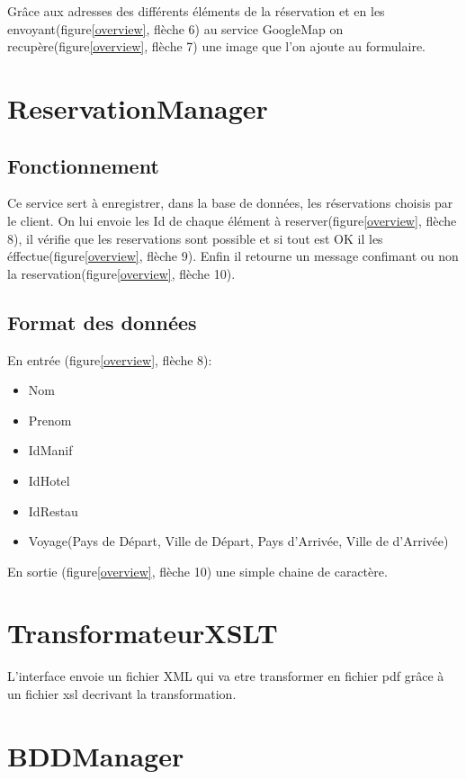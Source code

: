 		Grâce aux adresses des différents éléments de la réservation et en les
		envoyant(figure\ref{overview}, flèche 6) au service GoogleMap on
		recupère(figure\ref{overview}, flèche 7) une image que l'on ajoute au
		formulaire.
	
	\section{ReservationManager}	
	
		\subsection{Fonctionnement}
	
			Ce service sert à enregistrer, dans la base de données, les réservations
			choisis par le client. On lui envoie les Id de chaque élément à
			reserver(figure\ref{overview}, flèche 8), il vérifie que les reservations
			sont possible et si tout est OK il les éffectue(figure\ref{overview}, flèche
			9). Enfin il retourne un message confimant ou non la
			reservation(figure\ref{overview}, flèche 10).
	
		\subsection{Format des données}
		
			En entrée (figure\ref{overview}, flèche 8):
			\begin{itemize}
			  \item Nom
			  \item Prenom
			  \item IdManif
			  \item IdHotel
			  \item IdRestau
			  \item Voyage(Pays de Départ, Ville de Départ, Pays d'Arrivée, Ville de
			  d'Arrivée)\\
			\end{itemize}
	
			En sortie (figure\ref{overview}, flèche 10) une simple chaine de caractère.
	
	\section{TransformateurXSLT}
	
		L'interface envoie un fichier XML qui va etre transformer en fichier pdf grâce
		à un fichier xsl decrivant la transformation. 
	
	\section{BDDManager}
		
		
\clearpage
